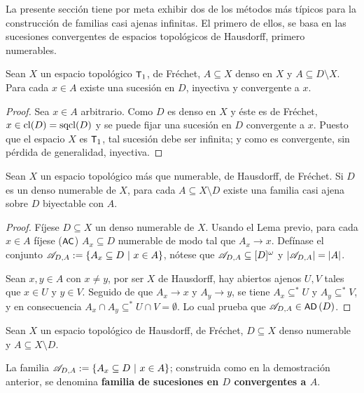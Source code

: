 	La presente sección tiene por meta exhibir dos de los métodos más típicos para la construcción de familias casi ajenas infinitas. El primero de ellos, se basa en las sucesiones convergentes de espacios topológicos de Hausdorff, primero numerables.
	
	\begin{lema}
		Sean $X$ un espacio topológico $\text{\textsf{\small T}}_1$, de Fréchet, $A\subseteq X$ denso en $X$ y $A \subseteq D \setminus X$. Para cada $x \in A$ existe una sucesión en $D$, inyectiva y convergente a $x$.
	\end{lema}
	\begin{proof}
		Sea $x\in A$ arbitrario. Como $D$ es denso en $X$ y éste es de Fréchet, $x \in \operatorname{cl}(D)=\operatorname{sqcl}(D)$ y se puede fijar una sucesión en $D$ convergente a $x$. Puesto que el espacio $X$ es $\text{\textsf{\small T}}_1$, tal sucesión debe ser infinita; y como es convergente, sin pérdida de generalidad, inyectiva.
	\end{proof}

	
	\begin{proposicion}\label{prop-famSucesiones}
		Sean $X$ un espacio topológico más que numerable, de Hausdorff, de Fréchet. Si $D$ es un denso numerable de $X$, para cada $A \subseteq X \setminus D$ existe una familia casi ajena sobre $D$ biyectable con $A$.
	\end{proposicion}
	
	\begin{proof}
		Fíjese $D\subseteq X$ un denso numerable de $X$. Usando el Lema previo, para cada $x \in A$ fíjese ($\text{\textsf{\small AC}}$) $A_x \subseteq D$ numerable de modo tal que $A_x \to x$. Defínase el conjunto $\mathscr{A}_{D,A}:=\{ A_x \subseteq D \text{ $|$ } x \in A \}$, nótese que $\mathscr{A}_{D,A} \subseteq [D]^\omega$ y $|\mathscr{A}_{D,A}|=|A|$.

		Sean $x,y \in A$ con $x \neq y$, por ser $X$ de Hausdorff, hay abiertos ajenos $U,V$ tales que $x \in U$ y $y \in V$. Seguido de que $A_x \to x$ y $A_y \to y$, se tiene $A_x \subseteq^* U$ y $A_y \subseteq ^* V$, y en consecuencia $A_x \cap A_y \subseteq^* U \cap V = \emptyset$. Lo cual prueba que $\mathscr{A}_{D,A} \in \operatorname{\text{\textsf{\small AD}}}\,(D)$.
	\end{proof}
	
	\begin{definicion}\label{def-FamSucesiones}
		Sean $X$ un espacio topológico de Hausdorff, de Fréchet, $D \subseteq X$ denso numerable y $A \subseteq X \setminus D$.
		
		La familia $\mathscr{A}_{D,A}:=\{ A_x \subseteq D \text{ $|$ } x \in A \}$; construida como en la demostración anterior, se denomina \textbf{familia de sucesiones en $D$ convergentes a $A$}.
	\end{definicion}

